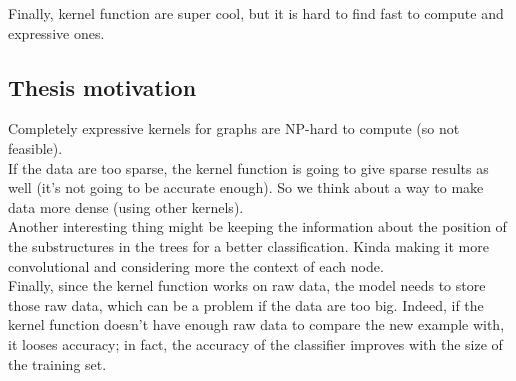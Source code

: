 Finally, kernel function are super cool, but it is hard to find fast to compute
and expressive ones.

\subsection{Thesis motivation}

Completely expressive kernels for graphs are NP-hard to compute (so not
feasible).\\
If the data are too sparse, the kernel function is going to give sparse results
as well (it's not going to be accurate enough). So we think about a way to make
data more dense (using other kernels).\\
Another interesting thing might be keeping the information about the position of
the substructures in the trees for a better classification. Kinda making it more
convolutional and considering more the context of each node.\\
Finally, since the kernel function works on raw data, the model needs to store
those raw data, which can be a problem if the data are too big. Indeed, if the
kernel function doesn't have enough raw data to compare the new example with, it
looses accuracy; in fact, the accuracy of the classifier improves with the size
of the training set.
